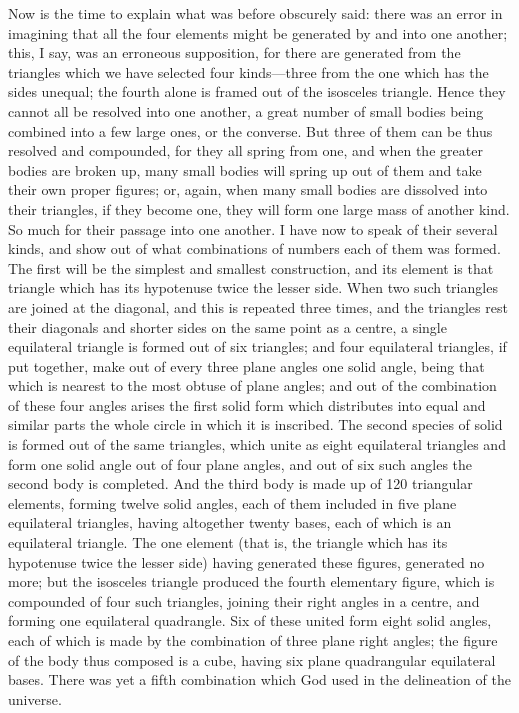 Now is the time to explain what was before obscurely said: there was an
error in imagining that all the four elements might be generated by and
into one another; this, I say, was an erroneous supposition, for there are
generated from the triangles which we have selected four kinds—three
from the one which has the sides unequal; the fourth alone is framed out
of the isosceles triangle. Hence they cannot all be resolved into one
another, a great number of small bodies being combined into a few large
ones, or the converse. But three of them can be thus resolved and
compounded, for they all spring from one, and when the greater bodies are
broken up, many small bodies will spring up out of them and take their own
proper figures; or, again, when many small bodies are dissolved into their
triangles, if they become one, they will form one large mass of another
kind. So much for their passage into one another. I have now to speak of
their several kinds, and show out of what combinations of numbers each of
them was formed. The first will be the simplest and smallest construction,
and its element is that triangle which has its hypotenuse twice the lesser
side. When two such triangles are joined at the diagonal, and this is
repeated three times, and the triangles rest their diagonals and shorter
sides on the same point as a centre, a single equilateral triangle is
formed out of six triangles; and four equilateral triangles, if put
together, make out of every three plane angles one solid angle, being that
which is nearest to the most obtuse of plane angles; and out of the
combination of these four angles arises the first solid form which
distributes into equal and similar parts the whole circle in which it is
inscribed. The second species of solid is formed out of the same
triangles, which unite as eight equilateral triangles and form one solid
angle out of four plane angles, and out of six such angles the second body
is completed. And the third body is made up of 120 triangular elements,
forming twelve solid angles, each of them included in five plane
equilateral triangles, having altogether twenty bases, each of which is an
equilateral triangle. The one element (that is, the triangle which has its
hypotenuse twice the lesser side) having generated these figures,
generated no more; but the isosceles triangle produced the fourth
elementary figure, which is compounded of four such triangles, joining
their right angles in a centre, and forming one equilateral quadrangle.
Six of these united form eight solid angles, each of which is made by the
combination of three plane right angles; the figure of the body thus
composed is a cube, having six plane quadrangular equilateral bases. There
was yet a fifth combination which God used in the delineation of the
universe.

